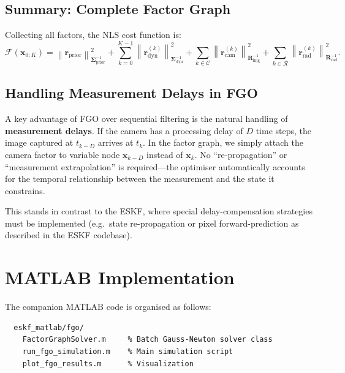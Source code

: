 \documentclass[11pt,a4paper]{article}
\newcommand{\state}{\bm{x}}
\newcommand{\resid}{\bm{r}}
\newcommand{\cov}{\bm{\Sigma}}
\newcommand{\mahal}[2]{\left\| #1 \right\|^{2}_{#2}}
\begin{document}
\subsection{Summary: Complete Factor Graph}

Collecting all factors, the NLS cost function is:
\begin{equation}
  \mathcal{F}(\state_{0:K})
  = \mahal{\resid_{\text{prior}}}{\cov_{\text{prior}}^{-1}}
  + \sum_{k=0}^{K-1} \mahal{\resid_{\text{dyn}}^{(k)}}{\cov_{\text{dyn}}^{-1}}
  + \sum_{k \in \mathcal{C}} \mahal{\resid_{\text{cam}}^{(k)}}{\bm{R}_{\text{img}}^{-1}}
  + \sum_{k \in \mathcal{R}} \mahal{\resid_{\text{rad}}^{(k)}}{\bm{R}_{\text{rad}}^{-1}}.
  \label{eq:full_cost}
\end{equation}

\subsection{Handling Measurement Delays in FGO}
\label{sec:delay}

A key advantage of FGO over sequential filtering is the natural handling
of \textbf{measurement delays}.  If the camera has a processing delay of
$D$ time steps, the image captured at $t_{k-D}$ arrives at $t_k$.  In
the factor graph, we simply attach the camera factor to variable node
$\state_{k-D}$ instead of $\state_k$.  No ``re-propagation'' or
``measurement extrapolation'' is required---the optimiser automatically
accounts for the temporal relationship between the measurement and the
state it constrains.

This stands in contrast to the ESKF, where special delay-compensation
strategies must be implemented (e.g.\ state re-propagation or pixel
forward-prediction as described in the ESKF codebase).

\section{MATLAB Implementation}
\label{sec:implementation}

The companion MATLAB code is organised as follows:
\begin{verbatim}
  eskf_matlab/fgo/
    FactorGraphSolver.m     % Batch Gauss-Newton solver class
    run_fgo_simulation.m    % Main simulation script
    plot_fgo_results.m      % Visualization
\end{verbatim}
\end{document}
